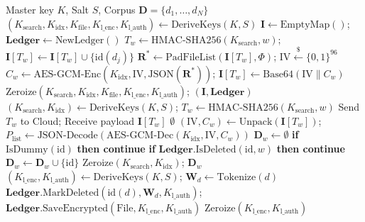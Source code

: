 \documentclass[10pt,conference]{IEEEtran}
\newenvironment{revised}{\color{revcolor}}{}
\newenvironment{revised}{\color{revcolor}}{}
\begin{document}
\begin{revised}
\begin{algorithm}[t]
\caption{VisioCrypt Volume-Hiding SSE with Authoritative Deletion Ledger}
\label{alg:protocols}
\scriptsize
\begin{algorithmic}[1]
\Require Master key $K$, Salt $S$, Corpus $\mathbf{D} = \{d_1, \dots, d_N\}$
    \State $(K_{\text{search}}, K_{\text{idx}}, K_{\text{file}}, K_{\text{l\_enc}}, K_{\text{l\_auth}}) \gets \text{DeriveKeys}(K, S)$
    \State $\mathbf{I} \gets \text{EmptyMap}()$; \quad $\mathbf{Ledger} \gets \text{NewLedger}()$
        \State $T_w \gets \text{HMAC-SHA256}(K_{\text{search}}, w)$; \quad $\mathbf{I}[T_w] \gets \mathbf{I}[T_w] \cup \{\text{id}(d_j)\}$
    \EndFor
        \State $\mathbf{R}^* \gets \text{PadFileList}(\mathbf{I}[T_w], \Phi)$; \quad $\text{IV} \xleftarrow{\$} \{0,1\}^{96}$
        \State $C_w \gets \text{AES-GCM-Enc}(K_{\text{idx}}, \text{IV}, \text{JSON}(\mathbf{R}^*))$; \quad $\mathbf{I}[T_w] \gets \text{Base64}(\text{IV} \parallel C_w)$
    \EndFor
    \State $\text{Zeroize}(K_{\text{search}}, K_{\text{idx}}, K_{\text{file}}, K_{\text{l\_enc}}, K_{\text{l\_auth}})$; \Return $(\mathbf{I}, \mathbf{Ledger})$
\EndProcedure
{}
    \State $(K_{\text{search}}, K_{\text{idx}}) \gets \text{DeriveKeys}(K, S)$; \quad $T_w \gets \text{HMAC-SHA256}(K_{\text{search}}, w)$
    \State Send $T_w$ to Cloud; \quad Receive payload $\mathbf{I}[T_w]$
     \Return $\emptyset$ \EndIf
    \State $(\text{IV}, C_w) \gets \text{Unpack}(\mathbf{I}[T_w])$; \quad $P_{\text{list}} \gets \text{JSON-Decode}(\text{AES-GCM-Dec}(K_{\text{idx}}, \text{IV}, C_w))$
    \State $\mathbf{D}_w \gets \emptyset$
        \State \textbf{if} $\text{IsDummy}(\text{id})$ \textbf{then continue}
        \State \textbf{if} $\mathbf{Ledger}.\text{IsDeleted}(\text{id}, w)$ \textbf{then continue} 
        \State $\mathbf{D}_w \gets \mathbf{D}_w \cup \{\text{id}\}$
    \EndFor
    \State $\text{Zeroize}(K_{\text{search}}, K_{\text{idx}})$; \Return $\mathbf{D}_w$
\EndProcedure
{}
    \State $(K_{\text{l\_enc}}, K_{\text{l\_auth}}) \gets \text{DeriveKeys}(K, S)$; \quad $\mathbf{W}_d \gets \text{Tokenize}(d)$
    \State $\mathbf{Ledger}.\text{MarkDeleted}(\text{id}(d), \mathbf{W}_d, K_{\text{l\_auth}})$; \quad $\mathbf{Ledger}.\text{SaveEncrypted}(\text{File}, K_{\text{l\_enc}}, K_{\text{l\_auth}})$
    \State $\text{Zeroize}(K_{\text{l\_enc}}, K_{\text{l\_auth}})$
\EndProcedure
\end{algorithmic}
\end{algorithm}


\end{revised}
\end{document}
